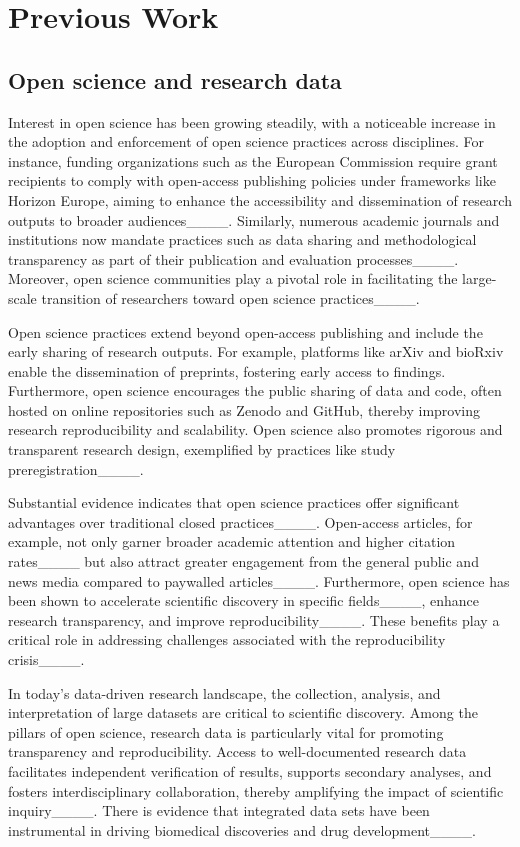 \section{Previous Work}
\label{sec:headings}

\subsection{Open science and research data}
Interest in open science has been growing steadily, with a noticeable increase in the adoption and enforcement of open science practices across disciplines. For instance, funding organizations such as the European Commission require grant recipients to comply with open-access publishing policies under frameworks like Horizon Europe, aiming to enhance the accessibility and dissemination of research outputs to broader audiences____. Similarly, numerous academic journals and institutions now mandate practices such as data sharing and methodological transparency as part of their publication and evaluation processes____. Moreover, open science communities play a pivotal role in facilitating the large-scale transition of researchers toward open science practices____.

Open science practices extend beyond open-access publishing and include the early sharing of research outputs. For example, platforms like arXiv and bioRxiv enable the dissemination of preprints, fostering early access to findings. Furthermore, open science encourages the public sharing of data and code, often hosted on online repositories such as Zenodo and GitHub, thereby improving research reproducibility and scalability. Open science also promotes rigorous and transparent research design, exemplified by practices like study preregistration____. 

Substantial evidence indicates that open science practices offer significant advantages over traditional closed practices____. Open-access articles, for example, not only garner broader academic attention and higher citation rates____ but also attract greater engagement from the general public and news media compared to paywalled articles____. Furthermore, open science has been shown to accelerate scientific discovery in specific fields____, enhance research transparency, and improve reproducibility____. These benefits play a critical role in addressing challenges associated with the reproducibility crisis____.

In today’s data-driven research landscape, the collection, analysis, and interpretation of large datasets are critical to scientific discovery. Among the pillars of open science, research data is particularly vital for promoting transparency and reproducibility. Access to well-documented research data facilitates independent verification of results, supports secondary analyses, and fosters interdisciplinary collaboration, thereby amplifying the impact of scientific inquiry____. There is evidence that integrated data sets have been instrumental in driving biomedical discoveries and drug development____.


